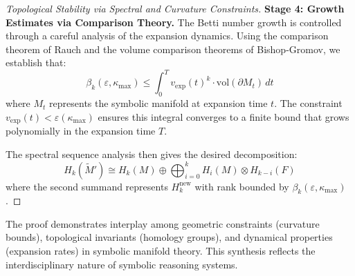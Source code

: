 \begin{proof}[Topological Stability via Spectral and Curvature Constraints]
\textbf{Stage 4: Growth Estimates via Comparison Theory.}
The Betti number growth is controlled through a careful analysis of the expansion dynamics. Using the comparison theorem of Rauch and the volume comparison theorems of Bishop-Gromov, we establish that:
\[
\beta_k(\varepsilon, \kappa_{\max}) \leq \int_0^T v_{\text{exp}}(t)^k \cdot \text{vol}(\partial M_t) \, dt
\]
where $M_t$ represents the symbolic manifold at expansion time $t$. The constraint $v_{\text{exp}}(t) < \varepsilon(\kappa_{\max})$ ensures this integral converges to a finite bound that grows polynomially in the expansion time $T$.

The spectral sequence analysis then gives the desired decomposition:
\[
H_k(\widetilde{M}') \cong H_k(M) \oplus \bigoplus_{i=0}^{k} H_i(M) \otimes H_{k-i}(F)
\]
where the second summand represents $H_k^{\mathrm{new}}$ with rank bounded by $\beta_k(\varepsilon, \kappa_{\max})$.
\end{proof}

The proof demonstrates interplay among geometric constraints (curvature
bounds), topological invariants (homology groups), and dynamical properties
(expansion rates) in symbolic manifold theory.
This synthesis reflects the interdisciplinary nature of symbolic reasoning
systems.

